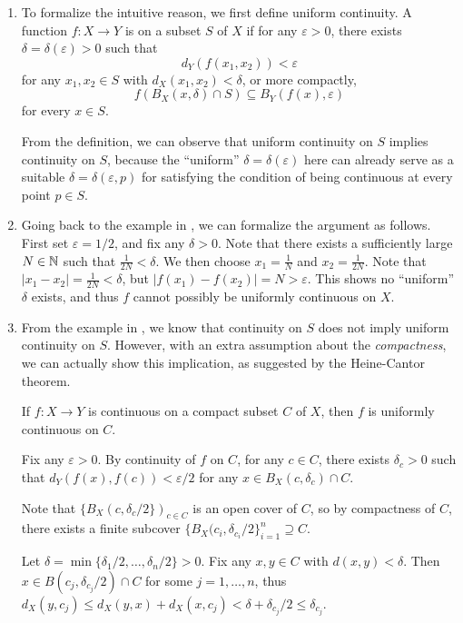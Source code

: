\begin{enumerate}
\item To formalize the intuitive reason, we first define uniform continuity. A
function \(f:X\to Y\) is  on a subset \(S\) of \(X\)
if for any \(\varepsilon>0\), there exists \(\delta=\delta(\varepsilon)>0\)
such that
\[
d_Y(f(x_1,x_2))<\varepsilon
\]
for any \(x_1,x_2\in S\) with \(d_X(x_1,x_2)<\delta\), or more compactly,
\[
f(B_X(x,\delta)\cap S)\subseteq B_Y(f(x),\varepsilon)
\]
for every \(x\in S\).

From the definition, we can observe that uniform continuity on \(S\) implies
continuity on \(S\), because the ``uniform'' \(\delta=\delta(\varepsilon)\)
here can already serve as a suitable \(\delta=\delta(\varepsilon,p)\) for
satisfying the condition of being continuous at every point \(p\in S\).

\item Going back to the example in , we can
formalize the argument as follows. First set \(\varepsilon=1/2\), and fix any
\(\delta>0\). Note that there exists a sufficiently large \(N\in\mathbb{N}\) such that
\(\frac{1}{2N}<\delta\). We then choose \(
x_1=\frac{1}{N}\) and \(x_2=\frac{1}{2N}\). Note that
\(|x_1-x_2|=\frac{1}{2N}<\delta\), but
\(|f(x_1)-f(x_2)|=N>\varepsilon\). This shows no ``uniform'' \(\delta\) exists,
and thus \(f\) cannot possibly be uniformly continuous on \(X\).

\item From the example in , we know that
continuity on \(S\) does not imply uniform continuity on \(S\). However, with
an extra assumption about the \emph{compactness}, we can actually show this
implication, as suggested by the Heine-Cantor theorem.

\begin{theorem}
\label{thm:heine-cantor}
If \(f:X\to Y\) is continuous on a compact subset \(C\) of \(X\), then \(f\) is
uniformly continuous on \(C\).
\end{theorem}
\begin{pf}
Fix any \(\varepsilon>0\). By continuity of \(f\) on \(C\), for any \(c\in C\),
there exists \(\delta_c>0\) such that \(d_Y(f(x),f(c))<\varepsilon/2\) for any
\(x\in B_X(c,\delta_c)\cap C\).

Note that \(\{B_X(c,\delta_c/2\})_{c\in C}\) is an open cover of \(C\), so by
compactness of \(C\), there exists a finite subcover
\(\{B_X(c_i,\delta_{c_i}/2\}_{i=1}^{n}\supseteq C\).

Let \(\delta=\min\{\delta_1/2,\dotsc,\delta_n/2\}>0\). Fix any \(x,y\in C\)
with \(d(x,y)<\delta\). Then \(x\in B(c_j,\delta_{c_j}/2)\cap C\) for some
\(j=1,\dotsc,n\), thus \(d_X(y,c_j)\le
d_X(y,x)+d_X(x,c_j)<\delta+\delta_{c_j}/2\le\delta_{c_j}\).


\end{pf}
\end{enumerate}
